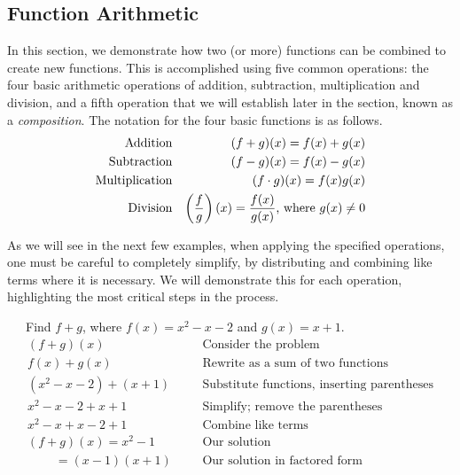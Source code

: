 \subsection{Function Arithmetic}

{}\pp

In this section, we demonstrate how two (or more) functions can be combined to create new functions. This is accomplished using five common
operations:  the four basic arithmetic operations of addition, subtraction, multiplication and division, and a fifth operation that we will establish later in the section, known as a \textit{composition}.\pp
The notation for the four basic functions is as follows. 
\begin{eqnarray*}
  \tmop{Addition} &  & (f + g) (x) = f (x) + g (x)\\   %
  \tmop{Subtraction} &  & (f - g) (x) = f (x) - g (x)\\  %
  \tmop{Multiplication} &  & (f \cdot g) (x) = f (x)g (x) \\ %
  \tmop{Division} &  & \left( \dfrac{f}{g}\right) (x) = \dfrac{f(x)}{g(x)} \text{,~where $g(x) \neq 0$}\\  %
\end{eqnarray*}

As we will see in the next few examples, when applying the specified operations, one must be careful to completely simplify, by distributing and combining like terms where it is necessary.  We will demonstrate this for each operation, highlighting the most critical steps in the process.

\begin{example}~~~Find $f+g$, where $f (x) = x^2 - x - 2$ and $g(x) = x + 1$.
  \begin{eqnarray*}
    (f + g)(x)~~~~~~~~~~ &  & \text{Consider the problem} \\
		f(x) + g(x)~~~~~~~~~ &  & \text{Rewrite~as~a~sum~of~two~functions}\\
		(x^2 - x - 2) + (x + 1) &  & \text{Substitute~functions,~inserting~parentheses}\\
		x^2 - x - 2 + x + 1~~ &  & \text{Simplify;~remove~the~parentheses}\\
		x^2 - x + x -2 + 1~~ &  & \text{Combine like terms}\\
    (f + g)(x)=x^2 - 1~~~~~~~~~~ &  & \text{Our solution}\\
    ~~~~~~~~~~=(x-1)(x+1) &  & \text{Our solution in factored form}
  \end{eqnarray*}
\end{example}
	
